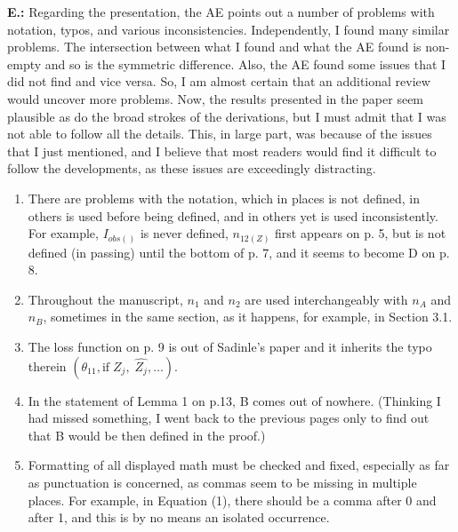 \documentclass[letterpaper, parskip]{scrartcl}
\newcommand{\pointRaised}[2]{%
	\textbf{#1.\theresponsectr:} #2
}
\newcounter{responsectr}[section]     %
\begin{document}
	\pointRaised{E}{%
	Regarding the presentation, the AE points out a number of problems with notation, typos, and various inconsistencies.  Independently, I found many similar problems.  The intersection between what I found and what the AE found is non-empty and so is the symmetric difference.  Also, the AE found some issues that I did not find and vice versa.  So, I am almost certain that an additional review would uncover more problems.  Now, the results presented in the paper seem plausible as do the broad strokes of the derivations, but I must admit that I was not able to follow all the details. This, in large part, was because of the issues that I just mentioned, and I believe that most readers would find it difficult to follow the developments, as these issues are exceedingly distracting.

	\begin{enumerate}
	\item There are problems with the notation, which in places is not defined, in others is used before being defined, and in others yet is used inconsistently. For example, $I_{obs()}$ is never defined, $n_{12(Z)}$ first appears on p. 5, but is not defined (in passing) until the bottom of p. 7, and it seems to become D on p. 8.
	\item Throughout the manuscript, $n_1$ and $n_2$ are used interchangeably with $n_A$ and $n_B$, sometimes in the same section, as it happens, for example, in Section 3.1.
	\item The loss function on p. 9 is out of Sadinle’s paper and it inherits the typo therein $(\theta_{11}, \text{if} \; Z_j, \;\hat{Z_j}, \ldots)$.
	\item  In the statement of Lemma 1 on p.13, B comes out of nowhere.  (Thinking I had missed something, I went back to the previous pages only to find out that B would be then defined in the proof.)
	\item Formatting of all displayed math must be checked and fixed, especially as far as punctuation is concerned, as commas seem to be missing in multiple places. For example, in Equation (1), there should be a comma after 0 and after 1, and this is by no means an isolated occurrence.
	\end{enumerate}
	}
\end{document}
